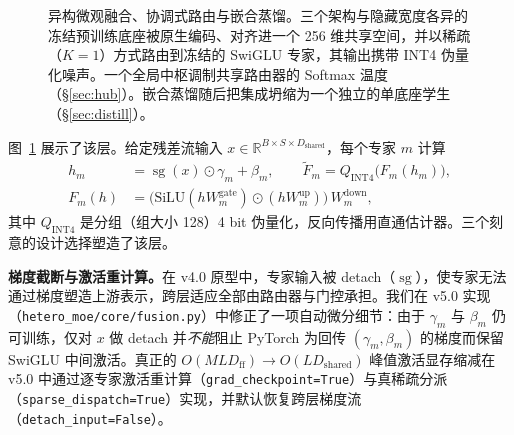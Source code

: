 \documentclass[10pt,twoside]{article}
\newcommand{\stopgrad}{\operatorname{sg}}
\newcommand{\R}{\mathbb{R}}
\theoremstyle{definition}
\theoremstyle{plain}
\theoremstyle{remark}
\begin{document}
\begin{figure}[htbp]
{}%
\caption{异构微观融合、协调式路由与嵌合蒸馏。三个架构与隐藏宽度各异的冻结预训练底座被原生编码、对齐进一个 256 维共享空间，并以稀疏（$K{=}1$）方式路由到冻结的 SwiGLU 专家，其输出携带 INT4 伪量化噪声。一个全局中枢调制共享路由器的 Softmax 温度（\S\ref{sec:hub}）。嵌合蒸馏随后把集成坍缩为一个独立的单底座学生（\S\ref{sec:distill}）。}
\label{fig:overview}
\end{figure}

图~\ref{fig:overview} 展示了该层。给定残差流输入 $x \in \R^{B \times S \times D_{\text{shared}}}$，每个专家 $m$ 计算
\begin{align}
\label{eq:expert}
h_m &= \stopgrad(x) \odot \gamma_m + \beta_m, \qquad
\tilde F_m = Q_{\text{INT4}}\big(F_m(h_m)\big), \\
F_m(h) &= \big(\mathrm{SiLU}(h W^{\text{gate}}_m) \odot (h W^{\text{up}}_m)\big)\, W^{\text{down}}_m,
\end{align}
其中 $Q_{\text{INT4}}$ 是分组（组大小 128）4 bit 伪量化，反向传播用直通估计器。三个刻意的设计选择塑造了该层。

\textbf{梯度截断与激活重计算。}在 v4.0 原型中，专家输入被 detach（$\stopgrad$），使专家无法通过梯度塑造上游表示，跨层适应全部由路由器与门控承担。我们在 v5.0 实现（\texttt{hetero\_moe/core/fusion.py}）中修正了一项自动微分细节：由于 $\gamma_m$ 与 $\beta_m$ 仍可训练，仅对 $x$ 做 detach 并\emph{不能}阻止 PyTorch 为回传 $(\gamma_m, \beta_m)$ 的梯度而保留 SwiGLU 中间激活。真正的 $O(M L D_{\text{ff}}) \to O(L D_{\text{shared}})$ 峰值激活显存缩减在 v5.0 中通过逐专家激活重计算（\texttt{grad\_checkpoint=True}）与真稀疏分派（\texttt{sparse\_dispatch=True}）实现，并默认恢复跨层梯度流（\texttt{detach\_input=False}）。
\end{document}

